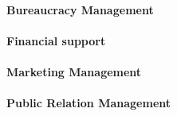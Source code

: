 %

\paragraph{Bureaucracy Management}
\paragraph{Financial support}
\paragraph{Marketing Management}
\paragraph{Public Relation Management}
